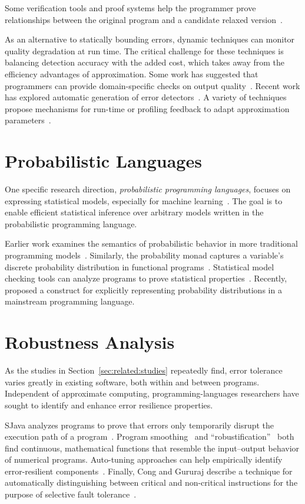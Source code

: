 Some verification tools and proof systems help
the programmer prove relationships between the original program and a
candidate relaxed version~\cite{carbin-pldi, carbin-races, carbin-pepm,
rice-transformation-semantics}.

As an alternative to statically bounding errors, dynamic techniques can
monitor quality degradation at run time.
The critical challenge for these techniques is balancing detection accuracy
with the added cost, which takes away from the efficiency advantages of
approximation.
Some work has suggested that programmers can provide domain-specific checks on
output quality~\cite{lwc, approxdebug}.
Recent work has explored automatic generation of error detectors~\cite{rumba}.
A variety of techniques propose mechanisms for run-time or profiling feedback to adapt
approximation parameters~\cite{dynamicknobs, green, approxit, ansel-autotuning}.


\section{Probabilistic Languages}

One specific research direction, \emph{probabilistic programming languages},
focuses on expressing statistical models, especially for machine
learning~\cite{BBGR13, wingate-lightweight, church, chaganty, pfeffersample,
probdsl, koller, sriram-pldi}.
The goal is to enable efficient statistical inference over arbitrary models
written in the probabilistic programming language.

Earlier work examines the semantics of probabilistic behavior in more
traditional programming models~\cite{kozen}.
Similarly, the probability monad captures a variable's discrete probability
distribution in functional programs~\cite{pmonad}.
Statistical model checking tools can analyze programs to prove statistical
properties~\cite{legay10, KNP11}.
Recently, \citet{uncertaint} proposed a construct for explicitly representing
probability distributions in a mainstream programming language.


\section{Robustness Analysis}

As the studies in Section~\ref{sec:related:studies} repeatedly find, error
tolerance varies greatly in existing software, both within and between
programs.
Independent of approximate computing, programming-languages researchers have
sought to identify and enhance error resilience properties.

SJava analyzes programs to prove that
errors only temporarily disrupt the execution path of a program~\cite{sjava}.
Program smoothing~\cite{smoothing-cav, smoothing-pldi, smoothing-fse} and
``robustification''~\cite{robustification} both find continuous, mathematical
functions that resemble the input--output behavior of numerical programs.
Auto-tuning approaches can help empirically identify error-resilient
components~\cite{asac}.
Finally, Cong and Gururaj describe a technique for automatically
distinguishing between critical and non-critical instructions for the purpose
of selective fault tolerance~\cite{cong-iccad}.
